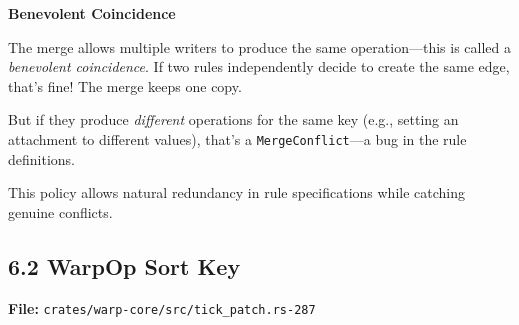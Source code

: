 \documentclass[11pt]{book}
\begin{document}
\begin{cleverpattern}
\textbf{Benevolent Coincidence}

The merge allows multiple writers to produce the same operation---this is called a \emph{benevolent coincidence}. If two rules independently decide to create the same edge, that's fine! The merge keeps one copy.

But if they produce \emph{different} operations for the same key (e.g., setting an attachment to different values), that's a \texttt{MergeConflict}---a bug in the rule definitions.

This policy allows natural redundancy in rule specifications while catching genuine conflicts.
\end{cleverpattern}

\subsection{6.2 WarpOp Sort Key}\label{warpop-sort-key}

\textbf{File:} \texttt{crates/warp-core/src/tick\_patch.rs-287}
\end{document}
